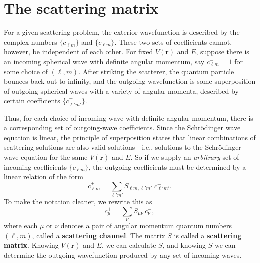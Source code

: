 \documentclass[pra,12pt]{revtex4}
\begin{document}
\section{The scattering matrix}

For a given scattering problem, the exterior wavefunction is described
by the complex numbers $\{c_{\ell m}^+\}$ and $\{c_{\ell m}^-\}$.
These two sets of coefficients cannot, however, be independent of each
other.  For fixed $V(\mathbf{r})$ and $E$, suppose there is an
incoming spherical wave with definite angular momentum, say $c_{\ell
  m}^- = 1$ for some choice of $(\ell,m)$.  After striking the
scatterer, the quantum particle bounces back out to infinity, and the
outgoing wavefunction is some superposition of outgoing spherical
waves with a variety of angular momenta, described by certain
coefficients $\{c_{\ell' m'}^+\}$.

Thus, for each choice of incoming wave with definite angular momentum,
there is a corresponding set of outgoing-wave coefficients.  Since the
Schr\"odinger wave equation is linear, the principle of superposition
states that linear combinations of scattering solutions are also valid
solutions---i.e., solutions to the Schr\"odinger wave equation for the
same $V(\mathbf{r})$ and $E$.  So if we supply an \textit{arbitrary}
set of incoming coefficients $\{c_{\ell m}^-\}$, the outgoing
coefficients must be determined by a linear relation of the form
\begin{equation}
  c_{\ell m}^+ = \sum_{\ell'm'} S_{\ell m, \ell' m'} \;c_{\ell' m'}^-.
\end{equation}
To make the notation cleaner, we rewrite this as
\begin{equation}
  c_{\mu}^+ = \sum_{\nu} S_{\mu \nu} \, c_{\nu}^-,
\end{equation}
where each $\mu$ or $\nu$ denotes a pair of angular momentum quantum
numbers $(\ell,m)$, called a \textbf{scattering channel}.  The matrix
$S$ is called a \textbf{scattering matrix}.  Knowing $V(\mathbf{r})$
and $E$, we can calculate $S$, and knowing $S$ we can determine the
outgoing wavefunction produced by any set of incoming waves.
\end{document}
